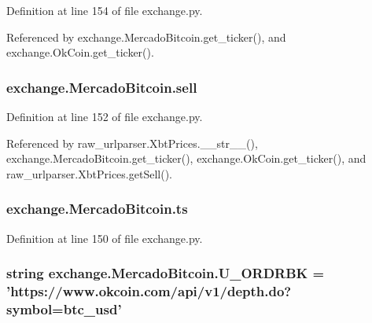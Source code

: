 Definition at line 154 of file exchange.\-py.



Referenced by exchange.\-Mercado\-Bitcoin.\-get\-\_\-ticker(), and exchange.\-Ok\-Coin.\-get\-\_\-ticker().

\hypertarget{classexchange_1_1_mercado_bitcoin_a9982c7a3f6103c88c64160a5854c35cd}{
\subsubsection[{sell}]{\setlength{\rightskip}{0pt plus 5cm}exchange.\-Mercado\-Bitcoin.\-sell}}\label{classexchange_1_1_mercado_bitcoin_a9982c7a3f6103c88c64160a5854c35cd}


Definition at line 152 of file exchange.\-py.



Referenced by raw\-\_\-urlparser.\-Xbt\-Prices.\-\_\-\-\_\-str\-\_\-\-\_\-(), exchange.\-Mercado\-Bitcoin.\-get\-\_\-ticker(), exchange.\-Ok\-Coin.\-get\-\_\-ticker(), and raw\-\_\-urlparser.\-Xbt\-Prices.\-get\-Sell().

\hypertarget{classexchange_1_1_mercado_bitcoin_ac4630b08e08f9eeb9dad838dc9dc0cda}{
\subsubsection[{ts}]{\setlength{\rightskip}{0pt plus 5cm}exchange.\-Mercado\-Bitcoin.\-ts}}\label{classexchange_1_1_mercado_bitcoin_ac4630b08e08f9eeb9dad838dc9dc0cda}


Definition at line 150 of file exchange.\-py.

\hypertarget{classexchange_1_1_mercado_bitcoin_a7dd22c2c0261557a694678d8057d2547}{
\subsubsection[{U\-\_\-\-O\-R\-D\-R\-B\-K}]{\setlength{\rightskip}{0pt plus 5cm}string exchange.\-Mercado\-Bitcoin.\-U\-\_\-\-O\-R\-D\-R\-B\-K = 'https\-://www.\-okcoin.\-com/api/v1/depth.\-do?symbol=btc\-\_\-usd'\hspace{0.3cm}{\ttfamily [static]}}}\label{classexchange_1_1_mercado_bitcoin_a7dd22c2c0261557a694678d8057d2547}


